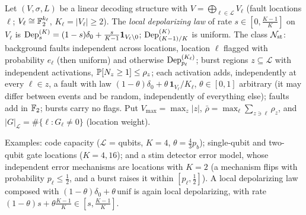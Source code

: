 \begin{definition}\label{def:local-dep}
Let $(V,\sigma,L)$ be a linear decoding structure with $V=\bigoplus_{\ell\in\mathcal L}V_\ell$ (fault locations $\ell$; $V_\ell\cong\mathbb{F}_2^{k_\ell}$, $K_\ell=|V_\ell|\ge2$). The \emph{local depolarizing law} of rate $s\in[0,\tfrac{K-1}K]$ on $V_\ell$ is $\mathrm{Dep}^{(K)}_s=(1-s)\delta_0+\tfrac s{K-1}\mathbf 1_{V_\ell\setminus0}$; $\mathrm{Dep}^{(K)}_{(K-1)/K}$ is uniform.
The class $\mathcal{N}_{\rm st}$: background faults independent across locations, location $\ell$ flagged with probability $e_\ell$ (then uniform) and otherwise $\mathrm{Dep}^{(K_\ell)}_{p_\ell}$; burst regions $z\subseteq\mathcal L$ with independent activations, $\mathbb{P}[N_z\ge1]\le\rho_z$; each activation adds, independently at every $\ell\in z$, a fault with law $(1-\theta)\delta_0+\theta\,\mathbf 1_{V_\ell}/K_\ell$, $\theta\in[0,1]$ arbitrary (it may differ between events and be random, independently of everything else); faults add in $\mathbb{F}_2$; bursts carry no flags.
Put $V_{\max}=\max_z|z|$, $\bar\rho=\max_\ell\sum_{z\ni\ell}\rho_z$, and $|G|_{\mathcal L}=\#\{\ell:G_\ell\ne0\}$ (location weight).
\end{definition}
\noindent Examples: code capacity ($\mathcal L$ = qubits, $K=4$, $\theta=\tfrac43p_b$); single-qubit and two-qubit gate locations ($K=4,16$); and a stim detector error model, whose independent error mechanisms are locations with $K=2$ (a mechanism flips with probability $p_\ell\le\tfrac12$, and a burst raises it within $[p_\ell,\tfrac12]$). A local depolarizing law composed with $(1-\theta)\delta_0+\theta\,\mathrm{unif}$ is again local depolarizing, with rate $(1-\theta)s+\theta\tfrac{K-1}K\in[s,\tfrac{K-1}K]$.

